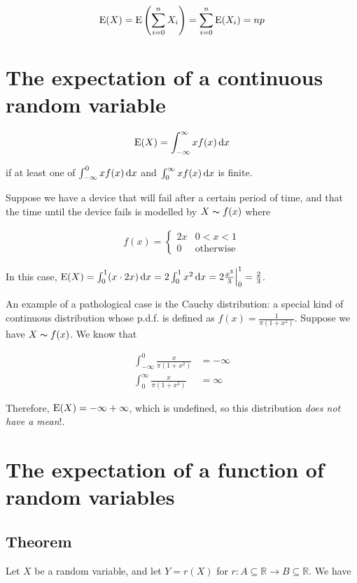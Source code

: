 \begin{align*}
  \mathrm{E}(X) = \mathrm{E} \left(\sum_{i = 0}^n X_i\right) = \sum_{i = 0}^n \mathrm{E}(X_i) = np
\end{align*}

\section{The expectation of a continuous random variable}

\begin{align*}
  \mathrm{E}(X) = \int_{-\infty}^{\infty} x f(x) \mathop{}\!\mathrm{d} x
\end{align*}

if at least one of $\int_{-\infty}^{0} x f(x) \mathop{}\!\mathrm{d} x$ and $\int_{0}^{\infty} x f(x) \mathop{}\!\mathrm{d} x$ is finite.

\ex
Suppose we have a device that will fail after a certain period of time, and that the time until the device fails is modelled by $X \thicksim f(x)$ where

\begin{align*}
  f(x) =
  \begin{cases}
    2x & 0 < x < 1 \\
    0 & \text{otherwise}
  \end{cases}
\end{align*}

In this case, $\mathrm{E}(X) = \int_0^1 (x \cdot 2x) \mathop{}\!\mathrm{d} x = 2 \int_0^1 x^2 \mathop{}\!\mathrm{d} x = 2 \frac{x^3}{3} \Big|_0^1 = \frac{2}{3}$.

\ex
An example of a pathological case is the Cauchy distribution: a special kind of continuous distribution whose p.d.f. is defined as $f(x) = \frac{1}{\pi(1 + x^2)}$. Suppose we have $X \thicksim f(x)$. We know that

\begin{align*}
  \int_{-\infty}^{0} \frac{x}{\pi(1 + x^2)} &= -\infty \\
  \int_0^{\infty} \frac{x}{\pi(1 + x^2)} &= \infty
\end{align*}

Therefore, $\mathrm{E}(X) = -\infty + \infty$, which is undefined, so this distribution \textit{does not have a mean}!.

\section{The expectation of a function of random variables}

\subsection{Theorem}
Let $X$ be a random variable, and let $Y = r(X)$ for $r: A \subseteq \mathbb{R} \rightarrow B \subseteq \mathbb{R}$. We have

